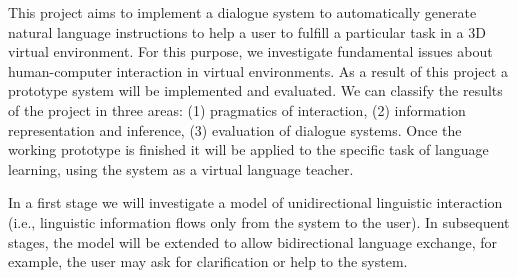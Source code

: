 

This project aims to implement a dialogue system to automatically generate
natural language instructions to help a user to fulfill a particular task in a
3D virtual environment. For this purpose, we investigate fundamental issues
about human-computer interaction in virtual environments. As a result of this
project a prototype system will be implemented and evaluated. We can
classify the results of the project in three areas: (1) pragmatics of
interaction, (2) information representation and inference, (3) evaluation of
dialogue systems. Once the working prototype is finished it will be applied to
the specific task of language learning, using the system as a virtual language
teacher. 


In a first stage we will investigate a model of unidirectional linguistic
interaction (i.e., linguistic information flows only from the system to the
user). In subsequent stages, the model will be extended to allow bidirectional
language exchange, for example, the user may ask for clarification or help to
the system.

